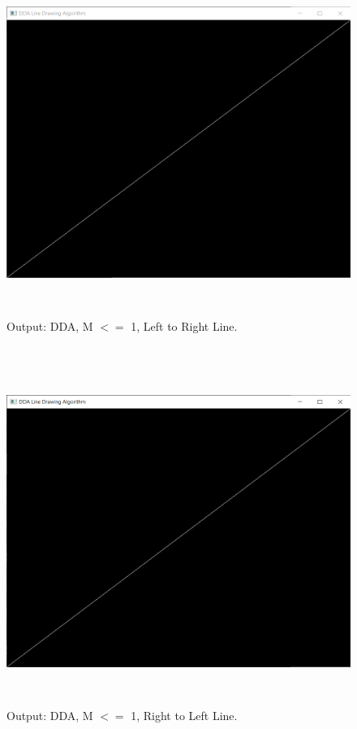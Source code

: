 \documentclass[12pt, a4]{article}
\begin{document}
\subsection*{}
\begin{figure}[h]
\centering
\caption{Output: DDA, M $<=$ 1, Left to Right Line.}
\includegraphics[height=11.25cm, width=15cm]{Outputs/1-DDA.png}
\end{figure}

\newpage
\subsection*{}
\begin{figure}[h]
\centering
\caption{Output: DDA, M $<=$ 1, Right to Left Line.}
\includegraphics[height=11.25cm, width=15cm]{Outputs/2-DDA.png}
\end{figure}
\end{document}
